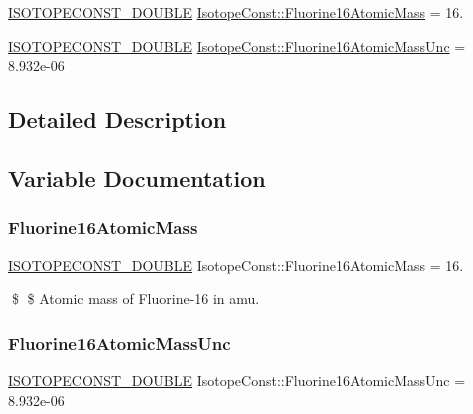 \begin{DoxyCompactItemize}
\item 
\mbox{\hyperlink{group___isotope_const-_macros_ga8f45a7272ce02c0b4c65c44636ed719a}{I\+S\+O\+T\+O\+P\+E\+C\+O\+N\+S\+T\+\_\+\+D\+O\+U\+B\+LE}} \mbox{\hyperlink{group___isotope_const-_fluorine-_f16_ga3471508393a24eb02c350b4939603809}{Isotope\+Const\+::\+Fluorine16\+Atomic\+Mass}} = 16.
\item 
\mbox{\hyperlink{group___isotope_const-_macros_ga8f45a7272ce02c0b4c65c44636ed719a}{I\+S\+O\+T\+O\+P\+E\+C\+O\+N\+S\+T\+\_\+\+D\+O\+U\+B\+LE}} \mbox{\hyperlink{group___isotope_const-_fluorine-_f16_ga64d742dfe8b20128817e08794c258044}{Isotope\+Const\+::\+Fluorine16\+Atomic\+Mass\+Unc}} = 8.\+932e-\/06
\end{DoxyCompactItemize}


\subsection{Detailed Description}


\subsection{Variable Documentation}
\mbox{\label{group___isotope_const-_fluorine-_f16_ga3471508393a24eb02c350b4939603809}} 
\subsubsection{\texorpdfstring{Fluorine16\+Atomic\+Mass}{Fluorine16AtomicMass}}
{\footnotesize\ttfamily \mbox{\hyperlink{group___isotope_const-_macros_ga8f45a7272ce02c0b4c65c44636ed719a}{I\+S\+O\+T\+O\+P\+E\+C\+O\+N\+S\+T\+\_\+\+D\+O\+U\+B\+LE}} Isotope\+Const\+::\+Fluorine16\+Atomic\+Mass = 16.}

\$ \$ Atomic mass of Fluorine-\/16 in amu. \mbox{\label{group___isotope_const-_fluorine-_f16_ga64d742dfe8b20128817e08794c258044}} 
\subsubsection{\texorpdfstring{Fluorine16\+Atomic\+Mass\+Unc}{Fluorine16AtomicMassUnc}}
{\footnotesize\ttfamily \mbox{\hyperlink{group___isotope_const-_macros_ga8f45a7272ce02c0b4c65c44636ed719a}{I\+S\+O\+T\+O\+P\+E\+C\+O\+N\+S\+T\+\_\+\+D\+O\+U\+B\+LE}} Isotope\+Const\+::\+Fluorine16\+Atomic\+Mass\+Unc = 8.\+932e-\/06}

